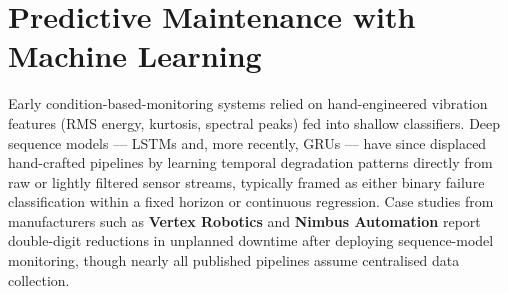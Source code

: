 \section{Predictive Maintenance with Machine Learning}
Early condition-based-monitoring systems relied on hand-engineered vibration features
(RMS energy, kurtosis, spectral peaks) fed into shallow classifiers. Deep sequence
models — LSTMs and, more recently, GRUs — have since displaced hand-crafted pipelines
by learning temporal degradation patterns directly from raw or lightly filtered sensor
streams, typically framed as either binary failure classification within a fixed
horizon or continuous  regression. Case studies
from manufacturers such as \textbf{Vertex Robotics} and \textbf{Nimbus Automation}
report double-digit reductions in unplanned downtime after deploying sequence-model
monitoring, though nearly all published pipelines assume centralised data collection.
